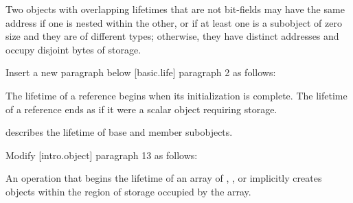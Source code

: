 \begin{adjustwidth}{0.5cm}{0.5cm}
Two objects with overlapping lifetimes that are not bit-fields may have the same address if one is nested within the other, or if at least one is a subobject of zero size and they are of different types; otherwise, they have distinct addresses and occupy disjoint bytes of storage.
\end{adjustwidth}


Insert a new paragraph below [basic.life] paragraph 2 as follows:

\begin{adjustwidth}{0.5cm}{0.5cm}
The lifetime of a reference begins when its initialization is complete. The lifetime of a reference ends as if it were a scalar object requiring storage.

\begin{note} describes the lifetime of base and member subobjects.
\end{note}

\end{adjustwidth}


Modify [intro.object] paragraph 13 as follows:

\begin{adjustwidth}{0.5cm}{0.5cm}
An operation that begins the lifetime of an array of , , or  implicitly creates objects within the region of storage occupied by the array.
\end{adjustwidth}


